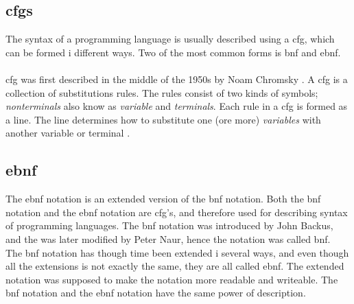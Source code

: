 \subsection{\ac{cfgs}}
\label{sec:cfg}
The syntax of a programming language is usually described using a \ac{cfg}, which can be formed i different ways. Two of the most common forms is \ac{bnf} and \ac{ebnf}. \\
\\
\ac{cfg} was first described in the middle of the 1950s by Noam Chromsky \cite{concepts_prog_lang}. A \ac{cfg} is a collection of substitutions rules. The rules consist of two kinds of symbols; \textit{nonterminals} also know as \textit{variable} and \textit{terminals}. Each rule in a \ac{cfg} is formed as a line. The line determines how to substitute one (ore more) \textit{variables} with another variable or terminal \cite{syntax_book}.

\subsection{\ac{ebnf}}
\label{sec:ebnf}
The \ac{ebnf} notation is an extended version of the \ac{bnf} notation. Both the \ac{bnf} notation and the \ac{ebnf} notation are \ac{cfg}'s, and therefore used for describing syntax of programming languages. The \ac{bnf} notation was introduced by John Backus, and the was later modified by Peter Naur, hence the notation was called \ac{bnf}. \\
The \ac{bnf} notation has though time been extended i several ways, and even though all the extensions is not exactly the same, they are all called \ac{ebnf}. The extended notation was supposed to make the notation more readable and writeable. The \ac{bnf} notation and the \ac{ebnf} notation have the same power of description. \cite{concepts_prog_lang}

